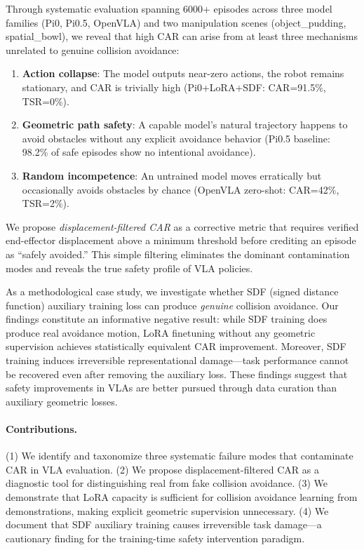 \documentclass[letterpaper]{article}
\begin{document}
Through systematic evaluation spanning 6000+ episodes across three model families (Pi0, Pi0.5, OpenVLA) and two manipulation scenes (object\_pudding, spatial\_bowl), we reveal that high CAR can arise from at least three mechanisms unrelated to genuine collision avoidance:
\begin{enumerate}
    \item \textbf{Action collapse}: The model outputs near-zero actions, the robot remains stationary, and CAR is trivially high (Pi0+LoRA+SDF: CAR=91.5\%, TSR=0\%).
    \item \textbf{Geometric path safety}: A capable model's natural trajectory happens to avoid obstacles without any explicit avoidance behavior (Pi0.5 baseline: 98.2\% of safe episodes show no intentional avoidance).
    \item \textbf{Random incompetence}: An untrained model moves erratically but occasionally avoids obstacles by chance (OpenVLA zero-shot: CAR=42\%, TSR=2\%).
\end{enumerate}

We propose \emph{displacement-filtered CAR} as a corrective metric that requires verified end-effector displacement above a minimum threshold before crediting an episode as ``safely avoided.'' This simple filtering eliminates the dominant contamination modes and reveals the true safety profile of VLA policies.

As a methodological case study, we investigate whether SDF (signed distance function) auxiliary training loss can produce \emph{genuine} collision avoidance. Our findings constitute an informative negative result: while SDF training does produce real avoidance motion, LoRA finetuning without any geometric supervision achieves statistically equivalent CAR improvement. Moreover, SDF training induces irreversible representational damage---task performance cannot be recovered even after removing the auxiliary loss. These findings suggest that safety improvements in VLAs are better pursued through data curation than auxiliary geometric losses.

\paragraph{Contributions.}
(1) We identify and taxonomize three systematic failure modes that contaminate CAR in VLA evaluation.
(2) We propose displacement-filtered CAR as a diagnostic tool for distinguishing real from fake collision avoidance.
(3) We demonstrate that LoRA capacity is sufficient for collision avoidance learning from demonstrations, making explicit geometric supervision unnecessary.
(4) We document that SDF auxiliary training causes irreversible task damage---a cautionary finding for the training-time safety intervention paradigm.
\end{document}
